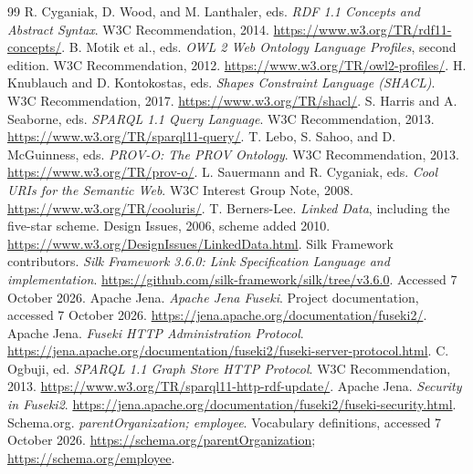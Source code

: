 \documentclass[11pt,a4paper]{article}
\begin{document}
\clearpage
\begin{thebibliography}{99}
 R. Cyganiak, D. Wood, and M. Lanthaler, eds. \emph{RDF 1.1 Concepts and Abstract Syntax}. W3C Recommendation, 2014. \url{https://www.w3.org/TR/rdf11-concepts/}.
 B. Motik et al., eds. \emph{OWL 2 Web Ontology Language Profiles}, second edition. W3C Recommendation, 2012. \url{https://www.w3.org/TR/owl2-profiles/}.
 H. Knublauch and D. Kontokostas, eds. \emph{Shapes Constraint Language (SHACL)}. W3C Recommendation, 2017. \url{https://www.w3.org/TR/shacl/}.
 S. Harris and A. Seaborne, eds. \emph{SPARQL 1.1 Query Language}. W3C Recommendation, 2013. \url{https://www.w3.org/TR/sparql11-query/}.
 T. Lebo, S. Sahoo, and D. McGuinness, eds. \emph{PROV-O: The PROV Ontology}. W3C Recommendation, 2013. \url{https://www.w3.org/TR/prov-o/}.
 L. Sauermann and R. Cyganiak, eds. \emph{Cool URIs for the Semantic Web}. W3C Interest Group Note, 2008. \url{https://www.w3.org/TR/cooluris/}.
 T. Berners-Lee. \emph{Linked Data}, including the five-star scheme. Design Issues, 2006, scheme added 2010. \url{https://www.w3.org/DesignIssues/LinkedData.html}.
 Silk Framework contributors. \emph{Silk Framework 3.6.0: Link Specification Language and implementation}. \url{https://github.com/silk-framework/silk/tree/v3.6.0}. Accessed 7 October 2026.
 Apache Jena. \emph{Apache Jena Fuseki}. Project documentation, accessed 7 October 2026. \url{https://jena.apache.org/documentation/fuseki2/}.
 Apache Jena. \emph{Fuseki HTTP Administration Protocol}. \url{https://jena.apache.org/documentation/fuseki2/fuseki-server-protocol.html}.
 C. Ogbuji, ed. \emph{SPARQL 1.1 Graph Store HTTP Protocol}. W3C Recommendation, 2013. \url{https://www.w3.org/TR/sparql11-http-rdf-update/}.
 Apache Jena. \emph{Security in Fuseki2}. \url{https://jena.apache.org/documentation/fuseki2/fuseki-security.html}.
 Schema.org. \emph{parentOrganization; employee}. Vocabulary definitions, accessed 7 October 2026. \url{https://schema.org/parentOrganization}; \url{https://schema.org/employee}.
\end{thebibliography}
\end{document}
